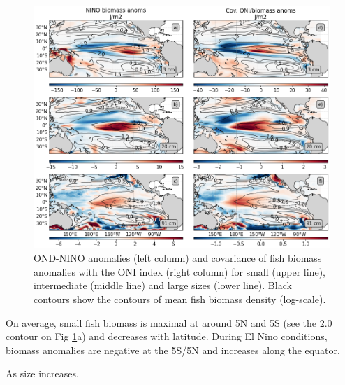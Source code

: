 \begin{figure}[htp]
	\centering
	\includegraphics[scale=0.4]{figs/map_mean_anom_OND_97.png}	
	\caption{OND-NINO anomalies (left column) and covariance of fish biomass anomalies with the ONI index (right column) for small (upper line), intermediate (middle line) and large sizes (lower line). Black contours show the contours of mean fish biomass density (log-scale).}	
	\label{fig:mean_ond97_ape}
\end{figure}

On average, small fish biomass is maximal at around 5\degree{}N and 5\degree{}S (see the $2.0$ contour on Fig \ref{fig:mean_ond97_ape}a) and decreases with latitude. During El Nino conditions, biomass anomalies are negative at the 5\degree{}S/5\degree{}N and increases along the equator.

As size increases, 

%
%
%

